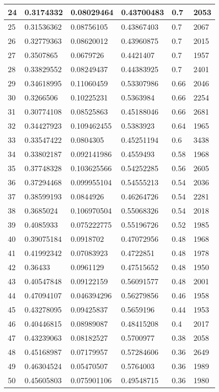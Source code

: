 \begin{longtable}{|l|l|l|l|l|l|}
24 & 0.3174332 & 0.08029464 & 0.43700483 & 0.7 & 2053 \\ \hline 
25 & 0.31536362 & 0.08756105 & 0.43867403 & 0.7 & 2067 \\ \hline 
26 & 0.32779363 & 0.08620012 & 0.43960875 & 0.7 & 2015 \\ \hline 
27 & 0.3507865 & 0.0679726 & 0.4421407 & 0.7 & 1957 \\ \hline 
28 & 0.33829552 & 0.08249437 & 0.44383925 & 0.7 & 2401 \\ \hline 
29 & 0.34618995 & 0.11060459 & 0.53307986 & 0.66 & 2046 \\ \hline 
30 & 0.3266506 & 0.10225231 & 0.5363984 & 0.66 & 2254 \\ \hline 
31 & 0.30774108 & 0.08525863 & 0.45188046 & 0.66 & 2681 \\ \hline 
32 & 0.34427923 & 0.109462455 & 0.5383923 & 0.64 & 1965 \\ \hline 
33 & 0.33547422 & 0.0804305 & 0.45251194 & 0.6 & 3438 \\ \hline 
34 & 0.33802187 & 0.092141986 & 0.4559493 & 0.58 & 1968 \\ \hline 
35 & 0.37748328 & 0.103625566 & 0.54252285 & 0.56 & 2605 \\ \hline 
36 & 0.37294468 & 0.099955104 & 0.54555213 & 0.54 & 2036 \\ \hline 
37 & 0.38599193 & 0.0844926 & 0.46264726 & 0.54 & 2281 \\ \hline 
38 & 0.3685024 & 0.106970504 & 0.55068326 & 0.54 & 2018 \\ \hline 
39 & 0.4085933 & 0.075222775 & 0.55196726 & 0.52 & 1985 \\ \hline 
40 & 0.39075184 & 0.0918702 & 0.47072956 & 0.48 & 1968 \\ \hline 
41 & 0.41992342 & 0.07083923 & 0.4722851 & 0.48 & 1978 \\ \hline 
42 & 0.36433 & 0.0961129 & 0.47515652 & 0.48 & 1950 \\ \hline 
43 & 0.40547848 & 0.09122159 & 0.56091577 & 0.48 & 2001 \\ \hline 
44 & 0.47094107 & 0.046394296 & 0.56279856 & 0.46 & 1958 \\ \hline 
45 & 0.43278095 & 0.09425837 & 0.5659196 & 0.44 & 1953 \\ \hline 
46 & 0.40446815 & 0.08989087 & 0.48415208 & 0.4 & 2017 \\ \hline 
47 & 0.43239063 & 0.08182527 & 0.5700977 & 0.38 & 2058 \\ \hline 
48 & 0.45168987 & 0.07179957 & 0.57284606 & 0.36 & 2649 \\ \hline 
49 & 0.46304524 & 0.05470507 & 0.5764003 & 0.36 & 1989 \\ \hline 
50 & 0.45605803 & 0.075901106 & 0.49548715 & 0.36 & 1980 \\ \hline 
\end{longtable}